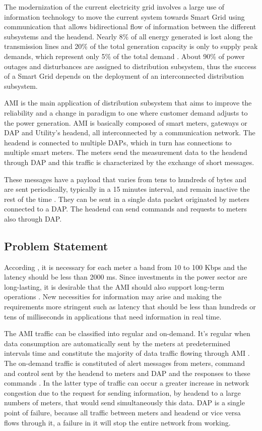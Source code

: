 \documentclass[conference]{IEEEtran}
\begin{document}
The modernization of the current electricity grid involves a large use of information technology to move the current system towards Smart Grid using communication that allows bidirectional flow of information between the different subsystems and the headend. Nearly 8\% of all energy generated is lost along the transmission lines and 20\% of the total generation capacity is only to supply peak demands, which represent only 5\% of the total demand \cite{Farhangi2010}. About 90\% of power outages and disturbances are assigned to distribution subsystem, thus the success of a Smart Grid depends on the deployment of an interconnected distribution subsystem. 

AMI is the main application of distribution subsystem that aims to improve the reliability and  a change in paradigm  to one where customer demand adjusts to the power generation. AMI is basically composed of smart meters, gateways or DAP and  Utility's headend, all interconnected by a communication network. 
The headend is connected to multiple DAPs, which in turn has connections to  multiple smart meters.
The meters send the measurement data to the headend through DAP and this traffic is characterized by the exchange of short messages.  

These messages have a payload that varies from tens to hundreds of bytes and are sent periodically, typically in a 15 minutes interval, and remain inactive the rest of the time \cite{SRS:13,4547164}. They can be sent in a single data packet originated by meters connected to a DAP. The headend can send commands and requests to meters also through DAP.


\subsection{Problem Statement}

According \cite{Gungor2013}, it is necessary for each meter a band from 10 to 100 Kbps and the latency should be less than 2000 ms. Since investments in the power sector are long-lasting, it is desirable that the AMI should also support long-term operations \cite{5484223}. New necessities for information may arise and making the requirements more stringent such as latency that should be less than hundreds or tens of milliseconds in applications that need information in real time.

The AMI traffic can be classified into regular and on-demand. It's regular when data consumption are automatically sent by the meters at predetermined intervals time \cite{Plan2011,4547164} and constitute the majority of data traffic flowing through AMI \cite{5484223}. The on-demand traffic is constituted of alert messages from meters, command and control sent by the headend  to meters and DAP and the responses to these commands \cite{Plan2011}. In the latter type of traffic can occur a greater increase in network congestion due to the request for sending information,  by  headend to a large numbers of meters, that would send simultaneously this data. DAP is a single point of failure, because all traffic between meters and headend or vice versa flows through it, a failure in it will stop the entire network from working.
\end{document}
